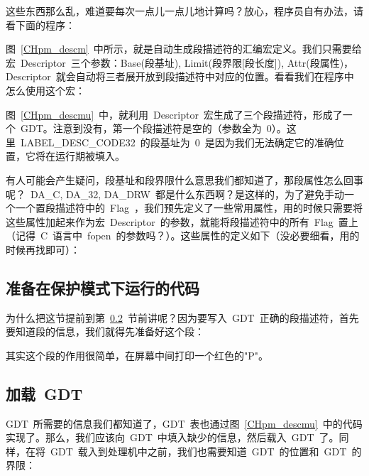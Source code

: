 这些东西那么乱，难道要每次一点儿一点儿地计算吗？放心，程序员自有办法，请看下面的程序：

\label{CHpm_descm}

图~\ref{CHpm_descm}~中所示，就是自动生成段描述符的汇编宏定义。我们只需要给宏~Descriptor~三个参数：Base(段基址), Limit(段界限[段长度]), Attr(段属性)，Descriptor~就会自动将三者展开放到段描述符中对应的位置。看看我们在程序中怎么使用这个宏：

\label{CHpm_descmu}

图~\ref{CHpm_descmu}~中，就利用~Descriptor~宏生成了三个段描述符，形成了一个~GDT。注意到没有，第一个段描述符是空的（参数全为~0）。这里~LABEL\_DESC\_CODE32~的段基址为~0~是因为我们无法确定它的准确位置，它将在运行期被填入。

有人可能会产生疑问，段基址和段界限什么意思我们都知道了，那段属性怎么回事呢？~DA\_C, DA\_32, DA\_DRW~都是什么东西啊？是这样的，为了避免手动一个一个置段描述符中的~Flag~，我们预先定义了一些常用属性，用的时候只需要将这些属性加起来作为宏~Descriptor~的参数，就能将段描述符中的所有~Flag~置上（记得~C~语言中~fopen~的参数吗？）。这些属性的定义如下（没必要细看，用的时候再找即可）：

\label{CHpm_segattr}

\subsection{准备在保护模式下运行的代码}

为什么把这节提前到第~\ref{CHpm_loadgdt}~节前讲呢？因为要写入~GDT~正确的段描述符，首先要知道段的信息，我们就得先准备好这个段：

\label{CHpm_demo1}

其实这个段的作用很简单，在屏幕中间打印一个红色的"P"。

\subsection{加载~GDT} \label{CHpm_loadgdt}

GDT~所需要的信息我们都知道了，GDT~表也通过图~\ref{CHpm_descmu}~中的代码实现了。那么，我们应该向~GDT~中填入缺少的信息，然后载入~GDT~了。同样，在将~GDT~载入到处理机中之前，我们也需要知道~GDT~的位置和~GDT~的界限：



